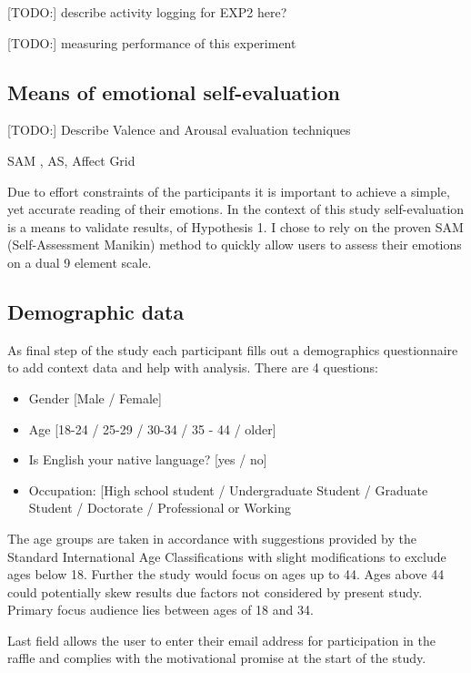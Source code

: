 		[TODO:] describe activity logging for EXP2 here?
		
		[TODO:] measuring performance of this experiment


	\subsection{Means of emotional self-evaluation} \label{sec:selfeval}
	
	
	
	[TODO:] Describe Valence and Arousal evaluation techniques
	
	SAM , AS, Affect Grid \cite{Russell1989}
	
	Due to effort constraints of the participants it is important to achieve a simple, yet accurate reading of their emotions. In the context of this study self-evaluation is a means to validate results, of Hypothesis 1. I chose to rely on the proven SAM (Self-Assessment Manikin) method \cite{Bradley1994} to quickly allow users to assess their emotions on a dual 9 element scale.
	
	\subsection{Demographic data} \label{sec:demographics}
	
	As final step of the study each participant fills out a demographics questionnaire to add context data and help with analysis. There are 4 questions:
	
	\begin{itemize}
		\item Gender [Male / Female]
		\item Age [18-24 / 25-29 / 30-34 / 35 - 44 / older]
		\item Is English your native language? [yes / no]
		\item Occupation: [High school student / Undergraduate Student / Graduate Student / Doctorate / Professional or Working
	\end{itemize}

	The age groups are taken in accordance with suggestions provided by the Standard International Age Classifications \cite{UN1982} with slight modifications to exclude ages below 18. Further the study would focus on ages up to 44. Ages above 44 could potentially skew results due factors not considered by present study. Primary focus audience lies between ages of 18 and 34.
	
	Last field allows the user to enter their email address for participation in the raffle and complies with the motivational promise at the start of the study.

